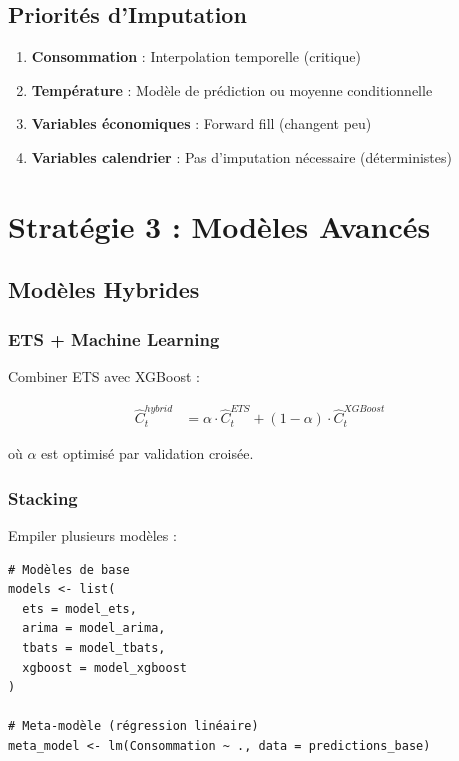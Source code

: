 \documentclass[12pt,a4paper]{article}
\begin{document}
\subsection{Priorités d'Imputation}

\begin{enumerate}
    \item \textbf{Consommation} : Interpolation temporelle (critique)
    \item \textbf{Température} : Modèle de prédiction ou moyenne conditionnelle
    \item \textbf{Variables économiques} : Forward fill (changent peu)
    \item \textbf{Variables calendrier} : Pas d'imputation nécessaire (déterministes)
\end{enumerate}

\section{Stratégie 3 : Modèles Avancés}

\subsection{Modèles Hybrides}

\subsubsection{ETS + Machine Learning}

Combiner ETS avec XGBoost :

\begin{align}
    \hat{C}_t^{hybrid} &= \alpha \cdot \hat{C}_t^{ETS} + (1-\alpha) \cdot \hat{C}_t^{XGBoost}
\end{align}

où $\alpha$ est optimisé par validation croisée.

\subsubsection{Stacking}

Empiler plusieurs modèles :

\begin{verbatim}
# Modèles de base
models <- list(
  ets = model_ets,
  arima = model_arima,
  tbats = model_tbats,
  xgboost = model_xgboost
)

# Meta-modèle (régression linéaire)
meta_model <- lm(Consommation ~ ., data = predictions_base)
\end{verbatim}
\end{document}
